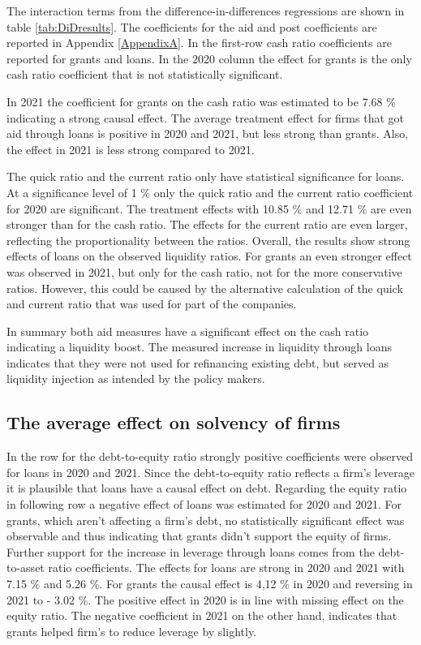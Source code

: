 The interaction terms from the difference-in-differences regressions are shown in table \ref{tab:DiDresults}. 
The coefficients for the aid and post coefficients are reported in Appendix \ref{AppendixA}. In the first-row cash ratio coefficients are reported for grants and loans. In the 2020 column the effect for grants is the only cash ratio coefficient that is not statistically significant. 

In 2021 the coefficient for grants on the cash ratio was estimated to be 7.68 \% indicating a strong causal effect. The average treatment effect for firms that got aid through loans is positive in 2020 and 2021, but less strong than grants. Also, the effect in 2021 is less strong compared to 2021.

The quick ratio and the current ratio only have statistical significance for loans. At a significance level of 1 \% only the quick ratio and the current ratio coefficient for 2020 are significant. The treatment effects with 10.85 \% and 12.71 \% are even stronger than for the cash ratio. The effects for the current ratio are even larger, reflecting the proportionality between the ratios. Overall, the results show strong effects of loans on the observed liquidity ratios. For grants an even stronger effect was observed in 2021, but only for the cash ratio, not for the more conservative ratios. However, this could be caused by the alternative calculation of the quick and current ratio that was used for part of the companies. 

In summary both aid measures have a significant effect on the cash ratio indicating a liquidity boost. The measured increase in liquidity through loans indicates that they were not used for refinancing existing debt, but served as liquidity injection as intended by the policy makers.

\subsection{The average effect on solvency of firms}

In the row for the debt-to-equity ratio strongly positive coefficients were observed for loans in 2020 and 2021. Since the debt-to-equity ratio reflects a firm's leverage it is plausible that loans have a causal effect on debt. Regarding the equity ratio in following row a negative effect of loans was estimated for 2020 and 2021. For grants, which aren't affecting a firm's debt, no statistically significant effect was observable and thus indicating that grants didn't support the equity of firms. Further support for the increase in leverage through loans comes from the debt-to-asset ratio coefficients. The effects for loans are strong in 2020 and 2021 with 7.15 \% and 5.26 \%. 
For grants the causal effect is 4,12 \% in 2020 and reversing in 2021 to - 3.02 \%. The positive effect in 2020 is in line with missing effect on the equity ratio. The negative coefficient in 2021 on the other hand, indicates that grants helped firm's to reduce leverage by slightly.

